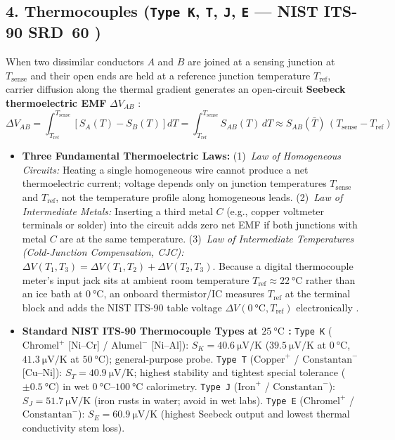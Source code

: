 \subsection{4. Thermocouples (\texttt{Type K}, \texttt{T}, \texttt{J}, \texttt{E} --- NIST ITS-90 SRD~60 )}
When two dissimilar conductors $A$ and $B$ are joined at a sensing junction at $T_{\mathrm{sense}}$ and their open ends are held at a reference junction temperature $T_{\mathrm{ref}}$, carrier diffusion along the thermal gradient generates an open-circuit \textbf{Seebeck thermoelectric EMF} $\Delta V_{AB}$ :
\begin{equation}\label{eq:17:seebeck}
  \Delta V_{AB} = \int_{T_{\mathrm{ref}}}^{T_{\mathrm{sense}}} \left[S_A(T) - S_B(T)\right]dT = \int_{T_{\mathrm{ref}}}^{T_{\mathrm{sense}}} S_{AB}(T)\,dT \approx S_{AB}(\bar{T})\,(T_{\mathrm{sense}} - T_{\mathrm{ref}})
\end{equation}
\begin{itemize}
  \item \textbf{Three Fundamental Thermoelectric Laws:}
    (1)~\emph{Law of Homogeneous Circuits:} Heating a single homogeneous wire cannot produce a net thermoelectric current; voltage depends only on junction temperatures $T_{\mathrm{sense}}$ and $T_{\mathrm{ref}}$, not the temperature profile along homogeneous leads.
    (2)~\emph{Law of Intermediate Metals:} Inserting a third metal $C$ (e.g., copper voltmeter terminals or solder) into the circuit adds zero net EMF if both junctions with metal $C$ are at the same temperature.
    (3)~\emph{Law of Intermediate Temperatures (Cold-Junction Compensation, CJC):} $\Delta V(T_1, T_3) = \Delta V(T_1, T_2) + \Delta V(T_2, T_3)$. Because a digital thermocouple meter's input jack sits at ambient room temperature $T_{\mathrm{ref}} \approx \SI{22}{\celsius}$ rather than an ice bath at $\SI{0}{\celsius}$, an onboard thermistor/IC measures $T_{\mathrm{ref}}$ at the terminal block and adds the NIST ITS-90 table voltage $\Delta V(\SI{0}{\celsius}, T_{\mathrm{ref}})$ electronically .
  \item \textbf{Standard NIST ITS-90 Thermocouple Types at $\SI{25}{\celsius}$ :}
    \texttt{Type K} ($\text{Chromel}^+$ [$\mathrm{Ni\text{--}Cr}$] / $\text{Alumel}^-$ [$\mathrm{Ni\text{--}Al}$]): $S_K = \SI{40.6}{\micro\volt\per\kelvin}$ ($\SI{39.5}{\micro\volt\per\kelvin}$ at $\SI{0}{\celsius}$, $\SI{41.3}{\micro\volt\per\kelvin}$ at $\SI{50}{\celsius}$); general-purpose probe.
    \texttt{Type T} ($\text{Copper}^+$ / $\text{Constantan}^-$ [$\mathrm{Cu\text{--}Ni}$]): $S_T = \SI{40.9}{\micro\volt\per\kelvin}$; highest stability and tightest special tolerance ($\pm\SI{0.5}{\celsius}$) in wet $\SIrange{0}{100}{\celsius}$ calorimetry.
    \texttt{Type J} ($\text{Iron}^+$ / $\text{Constantan}^-$): $S_J = \SI{51.7}{\micro\volt\per\kelvin}$ (iron rusts in water; avoid in wet labs).
    \texttt{Type E} ($\text{Chromel}^+$ / $\text{Constantan}^-$): $S_E = \SI{60.9}{\micro\volt\per\kelvin}$ (highest Seebeck output and lowest thermal conductivity stem loss).
\end{itemize}

